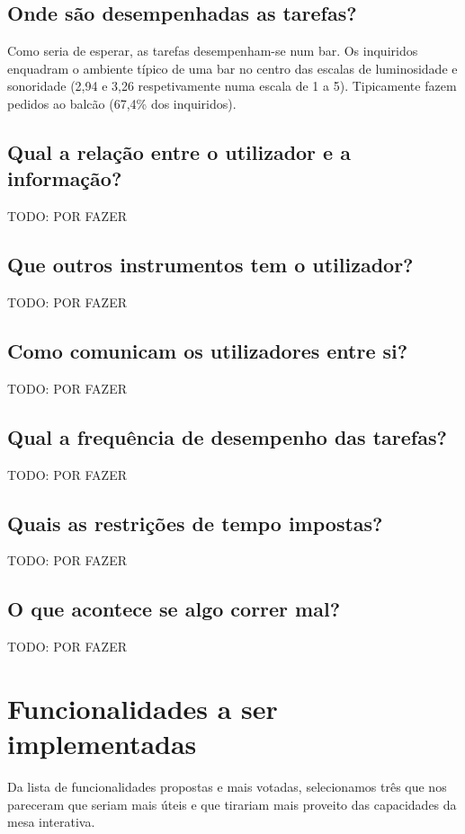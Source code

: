 \documentclass{article}
\begin{document}
\subsection*{Onde são desempenhadas as tarefas?}
Como seria de esperar, as tarefas desempenham-se num bar. Os inquiridos enquadram o ambiente típico de uma bar no centro das escalas de luminosidade e sonoridade (2,94 e 3,26 respetivamente numa escala de 1 a 5). Tipicamente fazem pedidos ao balcão (67,4\% dos inquiridos).
\subsection*{Qual a relação entre o utilizador e a informação?}
TODO: POR FAZER
\subsection*{Que outros instrumentos tem o utilizador?}
TODO: POR FAZER
\subsection*{Como comunicam os utilizadores entre si?}
TODO: POR FAZER
\subsection*{Qual a frequência de desempenho das tarefas?}
TODO: POR FAZER
\subsection*{Quais as restrições de tempo impostas?}
TODO: POR FAZER
\subsection*{O que acontece se algo correr mal?}
TODO: POR FAZER
\\

\section*{Funcionalidades a ser implementadas}

Da lista de funcionalidades propostas e mais votadas, selecionamos três que nos pareceram que seriam mais úteis e que tirariam mais proveito das capacidades da mesa interativa.
\end{document}
